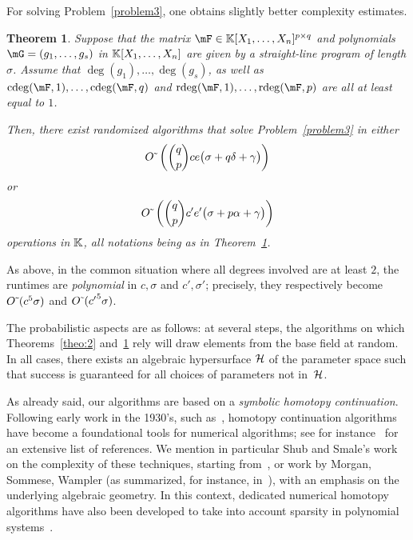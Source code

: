\documentclass[12pt]{article}
\newtheorem{theorem}[definition]{Theorem}
\begin{document}
For solving Problem~\eqref{problem3}, one obtains slightly better
complexity estimates. 

\begin{theorem}\label{theo:3}
  Suppose that the matrix $\mF \in \KK[X_1,\dots,X_n]^{p \times q}$
  and polynomials $\mG=(g_1,\dots,g_s)$ in $\mathbb{K}[X_1,\dots,X_n]$ are
  given by a straight-line program of length $\sigma$. Assume that
  $\deg(g_1),\dots,\deg(g_s)$, as well as
  $\cdeg(\mF,1), \ldots, \cdeg(\mF,q)$ and
  $\rdeg(\mF,1), \ldots, \rdeg(\mF,p)$ are all at least equal to $1$.

  Then, there exist randomized algorithms that solve
  Problem~\eqref{problem3} in either
   $${O}{\,\tilde{ }\,}\left (
     {q \choose p} ce\big(\sigma + q \delta + \gamma  \big )
   \right)$$
or 
   $${O}{\,\tilde{ }\,}\left (
     {q \choose p} c'e'\big(\sigma + p \alpha  +\gamma \big )
   \right)$$
  operations in $\mathbb{K}$, 
  all notations being as in Theorem~\ref{theo:3}.
\end{theorem}
As above, in the common situation where all degrees involved are at
least $2$, the runtimes are {\it polynomial} in $c, \sigma$ and
$c',\sigma'$; precisely, they respectively become ${O}{\,\tilde{ }\,} (c^5 \sigma)$ and ${O}{\,\tilde{ }\,}
({c'}^5 \sigma)$.


The probabilistic aspects are as follows: at several steps, the
algorithms on which Theorems~\ref{theo:2} and~\ref{theo:3} rely will
draw elements from the base field at random. In all cases, there
exists an algebraic hypersurface $\cal H$ of the parameter space such
that success is guaranteed for all choices of parameters not
in~$\cal H$.



As already said, our algorithms are based on a {\em symbolic homotopy
  continuation}. Following early work in the 1930's, such
as~\cite{Lahaye34}, homotopy continuation algorithms have become a
foundational tools for numerical algorithms; see for
instance~\cite{AlGe03} for an extensive list of references.  We
mention in particular Shub and Smale's work on the complexity of these
techniques, starting from~\cite{ShSm93}, or work by Morgan, Sommese,
Wampler (as summarized, for instance, in~\cite{BertiniBook,SoWa05}),
with an emphasis on the underlying algebraic geometry. In this
context, dedicated numerical homotopy algorithms have also been
developed to take into account sparsity in polynomial
systems~\cite{Ver94,Ver09,AdVe13}.
\end{document}
